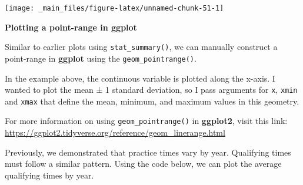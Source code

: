 \documentclass[
]{book}
\begin{document}
\begin{center}\texttt{[image: \_main\_files/figure-latex/unnamed-chunk-51-1]} \end{center}

\begin{blackbox}

\begin{center}
\textbf{Plotting a point-range in ggplot}

\end{center}

Similar to earlier plots using \texttt{stat\_summary()}, we can manually construct a point-range in \textbf{ggplot} using the \texttt{geom\_pointrange()}.

In the example above, the continuous variable is plotted along the x-axis. I wanted to plot the mean ± 1 standard deviation, so I pass arguments for \texttt{x}, \texttt{xmin} and \texttt{xmax} that define the mean, minimum, and maximum values in this geometry.

For more information on using \texttt{geom\_pointrange()} in \textbf{ggplot2}, visit this link: \url{https://ggplot2.tidyverse.org/reference/geom_linerange.html}

\end{blackbox}

Previously, we demonstrated that practice times vary by year. Qualifying times must follow a similar pattern. Using the code below, we can plot the average qualifying times by year.
\end{document}
